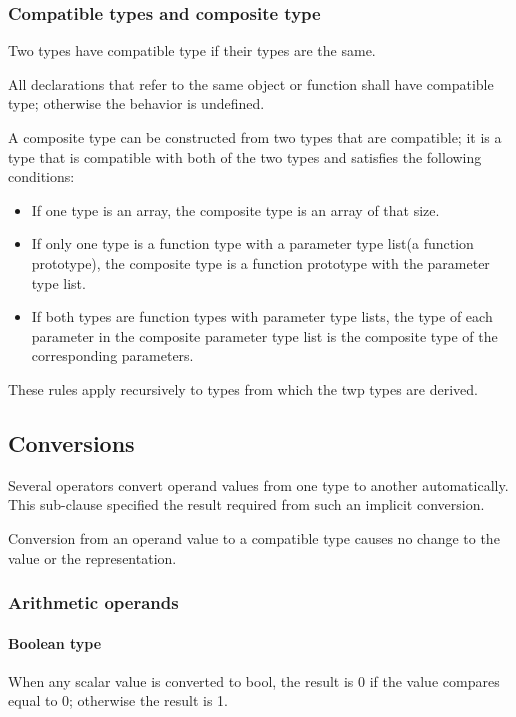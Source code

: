 \documentclass{article}
\begin{document}
\subsubsection{Compatible types and composite type}
Two types have compatible type if their types are the same.
\linebreak

All declarations that refer to the same object or function shall have compatible type; 
otherwise the behavior is undefined.
\linebreak

A composite type can be constructed from two types that are compatible; it is a type that 
is compatible with both of the two types and satisfies the following conditions:
\begin{itemize}
	\item If one type is an array, the composite type is an array of that size.
	\item If only one type is a function type with a parameter type list(a function 
	      prototype), the composite type is a function prototype with the parameter type 
	      list.
	\item If both types are function types with parameter type lists, the type of each 
	      parameter in the composite parameter type list is the composite type of the 
	      corresponding parameters.
\end{itemize}
These rules apply recursively to types from which the twp types are derived.
\linebreak

\subsection{Conversions}
Several operators convert operand values from one type to another automatically. This 
sub-clause specified the result required from such an implicit conversion.
\linebreak

Conversion from an operand value to a compatible type causes no change to the value or
the representation.
\linebreak

\subsubsection{Arithmetic operands}
\paragraph*{Boolean type}
When any scalar value is converted to bool, the result is 0 if the value compares equal 
to 0; otherwise the result is 1.
\end{document}
